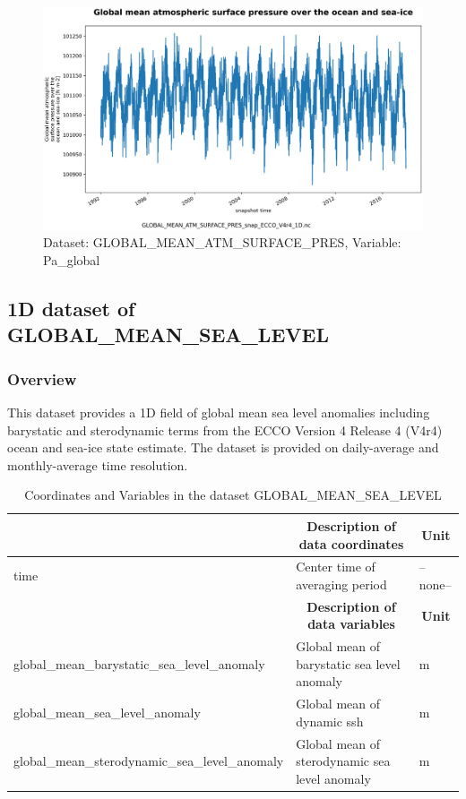 \begin{figure}[H]
\centering
\includegraphics[scale=0.55]{../images/plots/oneD_plots/Global_Mean_Atmospheric_Pressure/Pa_global.png}
\caption{Dataset: GLOBAL\_MEAN\_ATM\_SURFACE\_PRES, Variable: Pa\_global}
\label{tab:table-GLOBAL_MEAN_ATM_SURFACE_PRES_Pa_global-Plot}
\end{figure}
\newpage
\subsection{1D dataset of GLOBAL\_MEAN\_SEA\_LEVEL}
\newp
\subsubsection{Overview}
This dataset provides a 1D field of global mean sea level anomalies including barystatic and sterodynamic terms from the ECCO Version 4 Release 4 (V4r4) ocean and sea-ice state estimate. The dataset is provided on daily-average and monthly-average time resolution. 
\begin{longtable}{|m{}|m{}|m{}|}
\caption{Coordinates and Variables in the dataset GLOBAL\_MEAN\_SEA\_LEVEL}
\label{tab:table-GLOBAL_MEAN_SEA_LEVEL-fields} \\ 
\hline \endhead \hline \endfoot
\rowcolor{lightgray} \multicolumn{1}{|c|}{\textbf{Coordinates}} & \multicolumn{1}{|c|}{\textbf{Description of data coordinates}} &  \multicolumn{1}{|c|}{\textbf{Unit}}\\ \hline
time &Center time of averaging period &--none--  \\ \hline
\rowcolor{lightgray} \multicolumn{1}{|c|}{\textbf{Variables}} & \multicolumn{1}{|c|}{\textbf{Description of data variables}} &  \multicolumn{1}{|c|}{\textbf{Unit}}\\ \hline
global\_mean\_barystatic\_sea\_level\_anomaly &Global mean of barystatic sea level anomaly &m  \\ \hline
global\_mean\_sea\_level\_anomaly &Global mean of dynamic ssh &m  \\ \hline
global\_mean\_sterodynamic\_sea\_level\_anomaly &Global mean of sterodynamic sea level anomaly &m  \\ \hline
\end{longtable}

